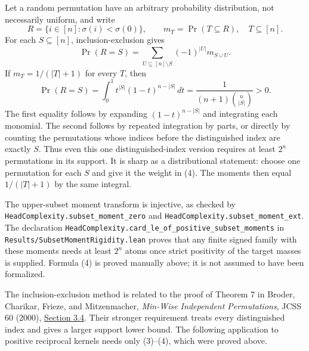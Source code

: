 \documentclass[11pt]{article}
\begin{document}
Let a random permutation have an arbitrary probability distribution,
not necessarily uniform, and write
\[
 R=\{i\in[n]:\sigma(i)<\sigma(0)\},\qquad
 m_T=\Pr(T\subseteq R),\quad T\subseteq[n].
\]
For each $S\subseteq[n]$, inclusion-exclusion gives
\[
 \Pr(R=S)=\sum_{U\subseteq[n]\setminus S}(-1)^{|U|}m_{S\cup U}.
 \tag{3}
\]
If $m_T=1/(|T|+1)$ for every $T$, then
\[
 \Pr(R=S)=\int_0^1t^{|S|}(1-t)^{n-|S|}\,dt
                 =\frac1{(n+1)\binom n{|S|}}>0.
 \tag{4}
\]
The first equality follows by expanding $(1-t)^{n-|S|}$ and
integrating each monomial. The second follows by repeated integration
by parts, or directly by counting the permutations whose indices
before the distinguished index are exactly $S$.
Thus even this one distinguished-index version requires at least
$2^n$ permutations in its support. It is sharp as a distributional
statement: choose one permutation for each $S$ and give it the weight
in (4). The moments then equal $1/(|T|+1)$ by the same integral.

The upper-subset moment transform is injective, as checked by
\texttt{HeadComplexity.subset\_moment\_zero} and
\texttt{HeadComplexity.subset\_moment\_ext}. The declaration
\texttt{HeadComplexity.card\_le\_of\_positive\_subset\_moments}
in \texttt{Results/SubsetMomentRigidity.lean} proves that any finite
signed family with these moments needs at least $2^n$ atoms once
strict positivity of the target masses is supplied. Formula (4) is
proved manually above; it is not assumed to have been formalized.

The inclusion-exclusion method is related to the proof of Theorem 7
in Broder, Charikar, Frieze, and Mitzenmacher,
\emph{Min-Wise Independent Permutations}, JCSS 60 (2000),
\href{https://www.cse.iitb.ac.in/~soumen/readings/papers/BroderCFM2000minwise.pdf}
{Section 3.4}. Their stronger requirement treats every distinguished
index and gives a larger support lower bound. The following application
to positive reciprocal kernels needs only (3)--(4), which were proved
above.
\end{document}
